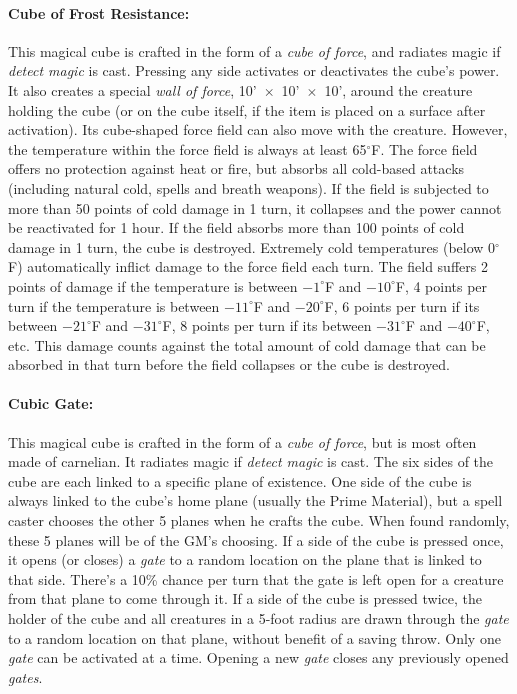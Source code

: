 \begin{multicols}{2}
\paragraph{Cube of Frost Resistance:} This magical cube is crafted in the form of a \textit{cube of force}, and radiates magic if \textit{detect magic} is cast.  Pressing any side activates or deactivates the cube's power.  It also creates a special \textit{wall of force}, 10'~$\times$~10'~$\times$~10', around the creature holding the cube (or on the cube itself, if the item is placed on a surface after activation).  Its cube-shaped force field can also move with the creature.  However, the temperature within the force field is always at least 65$^\circ$F.  The force field offers no protection against heat or fire, but absorbs all cold-based attacks (including natural cold, spells and breath weapons).  If the field is subjected to more than 50 points of cold damage in 1 turn, it collapses and the power cannot be reactivated for 1 hour.  If the field absorbs more than 100 points of cold damage in 1 turn, the cube is destroyed.  Extremely cold temperatures (below 0$^\circ$F) automatically inflict damage to the force field each turn.  The field suffers 2 points of damage if the temperature is between $-1^\circ$F and $-10^\circ$F, 4 points per turn if the temperature is between $-11^\circ$F and $-20^\circ$F, 6 points per turn if its between $-21^\circ$F and $-31^\circ$F, 8 points per turn if its between $-31^\circ$F and $-40^\circ$F, etc.  This damage counts against the total amount of cold damage that can be absorbed in that turn before the field collapses or the cube is destroyed.

\paragraph{Cubic Gate:} This magical cube is crafted in the form of a \textit{cube of force}, but is most often made of carnelian.  It radiates magic if \textit{detect magic} is cast.  The six sides of the cube are each linked to a specific plane of existence.  One side of the cube is always linked to the cube's home plane (usually the Prime Material), but a spell caster chooses the other 5 planes when he crafts the cube.  When found randomly, these 5 planes will be of the GM's choosing.  If a side of the cube is pressed once, it opens (or closes) a \textit{gate} to a random location on the plane that is linked to that side.  There's a 10\% chance per turn that the gate is left open for a creature from that plane to come through it.  If a side of the cube is pressed twice, the holder of the cube and all creatures in a 5-foot radius are drawn through the \textit{gate} to a random location on that plane, without benefit of a saving throw.  Only one \textit{gate} can be activated at a time.  Opening a new \textit{gate} closes any previously opened \textit{gates}.


\end{multicols}
